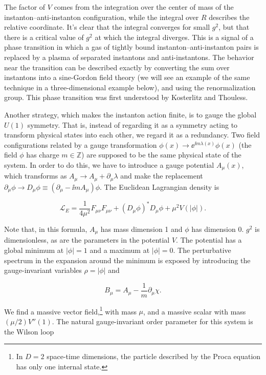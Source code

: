 The factor of $V$ comes from the integration over the center of mass of the
instanton--anti-instanton configuration, while the integral over $R$ describes
the relative coordinate. It's clear that the integral converges for small $g^2$,
but that there is a critical value of $g^2$ at which the integral diverges. This
is a signal of a phase transition in which a gas of tightly bound
instanton--anti-instanton pairs is replaced by a plasma of separated instantons
and anti-instantons. The behavior near the transition can be described exactly
by converting the sum over instantons into a sine-Gordon field theory (we will
see an example of the same technique in a three-dimensional example below), and
using the renormalization group. This phase transition was first understood by
Kosterlitz and Thouless.

Another strategy, which makes the instanton action finite, is to gauge the global
$U(1)$ symmetry. That is, instead of regarding it as a symmetry acting to
transform physical states into each other, we regard it as a redundancy. Two
field configurations related by a gauge transformation
$\phi(x)\to\ee^{\ii m\lambda(x)}\phi(x)$ (the field $\phi$ has charge
$m\in\mathbb Z$) are supposed to be the same physical state of the system. In
order to do this, we have to introduce a gauge potential $A_\mu(x)$, which
transforms as $A_\mu\to A_\mu+\partial_\mu\lambda$ and make the replacement
$\partial_\mu\phi\to D_\mu\phi\equiv(\partial_\mu-\ii mA_\mu)\phi$. The
Euclidean Lagrangian density is

\[
  \mathcal L_E=\frac{1}{4\mu^2}F_{\mu\nu}F_{\mu\nu}
  +(D_\mu\phi)^*D_\mu\phi+\mu^2V(|\phi|).
\]

Note that, in this formula, $A_\mu$ has mass dimension 1 and $\phi$ has
dimension 0. $g^2$ is dimensionless, as are the parameters in the potential
$V$. The potential has a global minimum at $|\phi|=1$ and a maximum at
$|\phi|=0$. The perturbative spectrum in the expansion around the minimum is
exposed by introducing the gauge-invariant variables $\rho=|\phi|$ and

\[
  B_\mu=A_\mu-\frac{1}{m}\partial_\mu\chi.
\]

We find a massive vector field,\footnote[7]{In $D=2$ space-time dimensions, the
particle described by the Proca equation has only one internal state.} with mass
$\mu$, and a massive scalar with mass $(\mu/2)V''(1)$. The natural
gauge-invariant order parameter for this system is the Wilson loop

